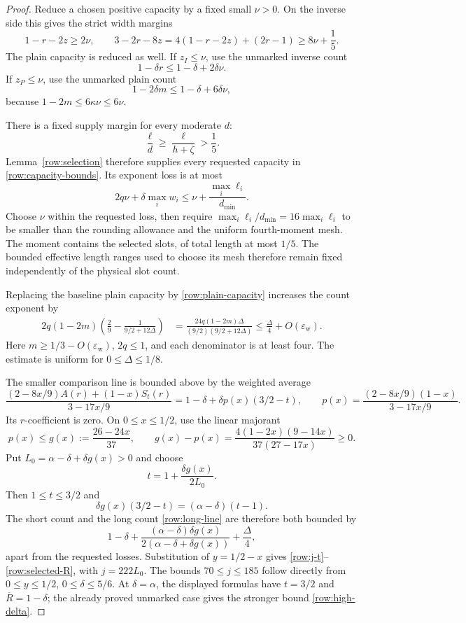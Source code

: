 \documentclass[11pt,a4paper]{article}
\numberwithin{equation}{section}
\theoremstyle{definition}
\theoremstyle{remark}
\newcommand{\eps}{\varepsilon}
\begin{document}
\begin{proof}
Reduce a chosen positive capacity by a fixed small \(\nu>0\).
On the inverse side this gives the strict width margins
\[
 1-r-2z\ge2\nu,\qquad
 3-2r-8z
 =4(1-r-2z)+(2r-1)\ge8\nu+\frac15.
\]
The plain capacity is reduced as well.  If \(z_I\le\nu\), use the
unmarked inverse count
\[
 1-\delta r\le1-\delta+2\delta\nu.
\]
If \(z_P\le\nu\), use the unmarked plain count
\[
 1-2\delta m\le1-\delta+6\delta\nu,
\]
because \(1-2m\le6\kappa\nu\le6\nu\).

There is a fixed supply margin for every moderate \(d\):
\begin{equation}\label{row:supply}
 \frac{\ell}{d}\ge\frac{\ell}{h+\zeta}>\frac15.
\end{equation}
Lemma~\ref{row:selection} therefore supplies every requested capacity
in \eqref{row:capacity-bounds}.  Its exponent loss is at most
\[
 2q\nu+\delta\max_iw_i
 \le \nu+\frac{\max_i\ell_i}{d_{\min}}.
\]
Choose \(\nu\) within the requested loss, then require
\(\max_i\ell_i/d_{\min}=16\max_i\ell_i\) to be smaller than the
rounding allowance and the uniform fourth-moment mesh.  The moment contains the selected slots, of total length at most
\(1/5\).
The bounded effective length ranges used to choose its mesh therefore
remain fixed independently of the physical slot count.

Replacing the baseline plain capacity by
\eqref{row:plain-capacity} increases the count exponent by
\begin{align}
 2q(1-2m)
       \left(\frac29-\frac1{9/2+12\Delta}\right)
 &=\frac{24q(1-2m)\Delta}{(9/2)(9/2+12\Delta)}
 \le\frac{\Delta}{4}+O(\eps_{\mathrm w}).
 \label{row:dynamic-cost}
\end{align}
Here \(m\ge1/3-O(\eps_{\mathrm w})\), \(2q\le1\), and
each denominator is at least four.  The estimate is uniform for
\(0\le\Delta\le1/8\).

The smaller comparison line is bounded above by the weighted average
\[
 \frac{(2-8x/9)A(r)+(1-x)S_t(r)}{3-17x/9}
 =1-\delta+\delta p(x)(3/2-t),
 \qquad
 p(x)=\frac{(2-8x/9)(1-x)}{3-17x/9}.
\]
Its \(r\)-coefficient is zero.  On \(0\le x\le1/2\), use the linear
majorant
\begin{equation}\label{row:linear-majorant}
 p(x)\le g(x):=\frac{26-24x}{37},\qquad
 g(x)-p(x)=
 \frac{4(1-2x)(9-14x)}{37(27-17x)}\ge0.
\end{equation}
Put \(L_0=\alpha-\delta+\delta g(x)>0\) and choose
\[
 t=1+\frac{\delta g(x)}{2L_0}.
\]
Then \(1\le t\le3/2\) and
\[
 \delta g(x)(3/2-t)=(\alpha-\delta)(t-1).
\]
The short count and the long count \eqref{row:long-line} are therefore
both bounded by
\[
 1-\delta+
 \frac{(\alpha-\delta)\delta g(x)}
      {2(\alpha-\delta+\delta g(x))}
 +\frac{\Delta}{4},
\]
apart from the requested losses.  Substitution of \(y=1/2-x\) gives
\eqref{row:j-t}--\eqref{row:selected-R}, with \(j=222L_0\).
The bounds \(70\le j\le185\) follow directly from
\(0\le y\le1/2\), \(0\le\delta\le5/6\).  At \(\delta=\alpha\),
the displayed formulas have \(t=3/2\) and
\(\overline R=1-\delta\); the already proved unmarked case gives
the stronger bound \eqref{row:high-delta}.


\end{proof}
\end{document}
